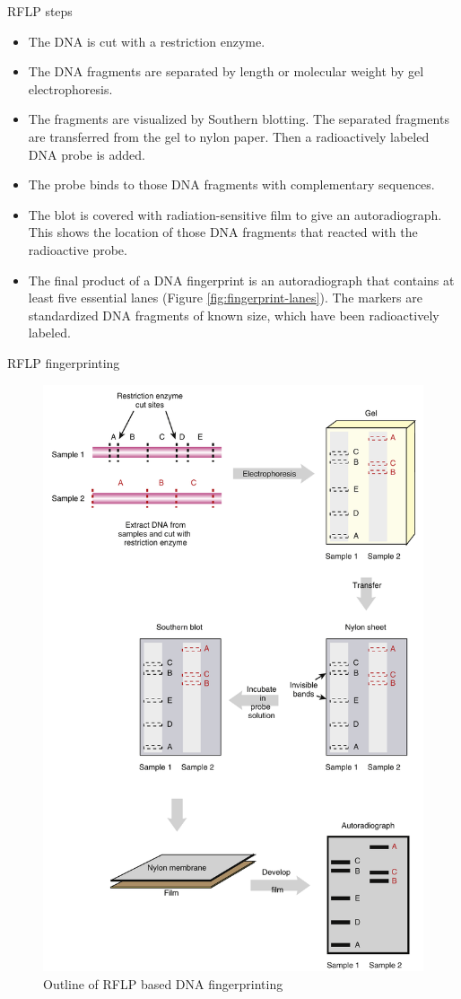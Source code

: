 \documentclass[ignorenonframetext,aspectratio=169]{beamer}
\providecommand{\tightlist}{%
  \setlength{\itemsep}{0pt}\setlength{\parskip}{0pt}}
\begin{document}
\begin{frame}{RFLP steps}
\protect\hypertarget{rflp-steps}{}

\begin{itemize}
\tightlist
\item
  The DNA is cut with a restriction enzyme.
\item
  The DNA fragments are separated by length or molecular weight by gel
  electrophoresis.
\item
  The fragments are visualized by Southern blotting. The separated
  fragments are transferred from the gel to nylon paper. Then a
  radioactively labeled DNA probe is added.
\item
  The probe binds to those DNA fragments with complementary sequences.
\item
  The blot is covered with radiation-sensitive film to give an
  autoradiograph. This shows the location of those DNA fragments that
  reacted with the radioactive probe.
\item
  The final product of a DNA fingerprint is an autoradiograph that
  contains at least five essential lanes (Figure
  \ref{fig:fingerprint-lanes}). The markers are standardized DNA
  fragments of known size, which have been radioactively labeled.
\end{itemize}

\end{frame}

\begin{frame}{RFLP fingerprinting}
\protect\hypertarget{rflp-fingerprinting}{}

\begin{figure}
\includegraphics[width=0.32\linewidth]{../images/rflp_fingerprinting} \caption{Outline of RFLP based DNA fingerprinting}\label{fig:rflp-fingerprinting}
\end{figure}

\end{frame}
\end{document}
